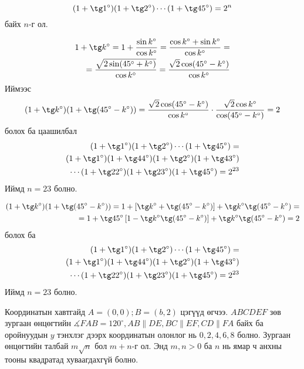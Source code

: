 \documentclass[10pt,a4paper,oneside]{book}
\begin{document}
\Problem
[AMC12P 2002]
\begin{equation*}
(1+\tg 1^\circ)(1+\tg 2^\circ)\cdots(1+\tg 45^\circ) = 2^n
\end{equation*}
байх $n$-г ол.

\ASolution
\begin{align*}
1+\tg k^\circ = 1+\frac{\sin k^\circ}{\cos k^\circ} = \frac{\cos k^\circ + \sin k^\circ}{\cos k^\circ} = \\
= \frac{\sqrt{2\sin(45^\circ + k^\circ)}}{\cos k^\circ} = \frac{\sqrt{2}\cos(45^\circ-k^\circ)}{\cos k^\circ}
\end{align*}
Иймээс
\begin{align*}
(1+\tg k^\circ)(1+\tg(45^\circ-k^\circ)) = \frac{\sqrt{2}\cos(45^\circ - k^\circ)}{\cos k^\circ}\cdot \frac{\sqrt{2}\cos k^\circ}{\cos (45^\circ - k^\circ)} = 2
\end{align*}
болох ба цаашилбал
\begin{align*}
(1+\tg 1^\circ)(1+\tg 2^\circ)\cdots(1+\tg 45^\circ) =\\
(1+\tg 1^\circ)(1+\tg 44^\circ)(1+\tg 2^\circ)(1+\tg 43^\circ)\\
\cdots(1+\tg 22^\circ)(1+\tg 23^\circ)(1+\tg 45^\circ) = 2^{23}
\end{align*}
Иймд $n=23$ болно.

\ASolution
\begin{align*}
(1+\tg k^\circ)(1+\tg (45^\circ-k^\circ)) = 1+\left[\tg k^\circ + \tg (45^\circ - k^\circ)\right] + \tg k^\circ \tg (45^\circ - k^\circ) = \\
= 1+\tg 45^\circ\left[1- \tg k^\circ \tg(45^\circ - k^\circ)\right] + \tg k^\circ \tg (45^\circ - k^\circ) = 2
\end{align*}
болох ба
\begin{align*}
(1+\tg 1^\circ)(1+\tg 2^\circ)\cdots(1+\tg 45^\circ) =\\
(1+\tg 1^\circ)(1+\tg 44^\circ)(1+\tg 2^\circ)(1+\tg 43^\circ)\\
\cdots(1+\tg 22^\circ)(1+\tg 23^\circ)(1+\tg 45^\circ) = 2^{23}
\end{align*}
Иймд $n=23$ болно.

\Problem
[AIME 2003] Координатын хавтгайд $A=(0, 0); B=(b, 2)$ цэгүүд өгчээ. $ABCDEF$ зөв зургаан өнцөгтийн $\measuredangle FAB = 120^\circ, AB \| DE, BC\|EF, CD\|FA$ байх ба оройнуудын $y$ тэнхлэг дээрх координатын олонлог нь ${0, 2, 4, 6, 8}$ болно. Зургаан өнцөгтийн талбай $m\sqrt{n}$ бол $m+n$-г ол. Энд $m, n > 0$ ба $n$ нь ямар ч анхны тооны квадратад хуваагдахгүй болно.
\end{document}

